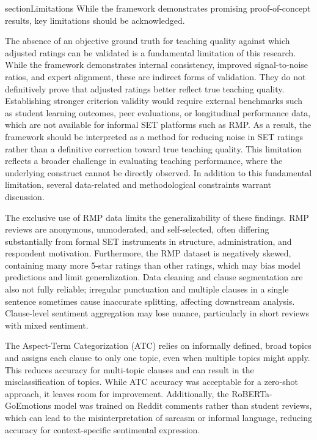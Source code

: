 section{Limitations}
While the framework demonstrates promising proof-of-concept results, key limitations should be acknowledged. 

The absence of an objective ground truth for teaching quality against which adjusted ratings can be validated is a fundamental limitation of this research. While the framework demonstrates internal consistency, improved signal-to-noise ratios, and expert alignment, these are indirect forms of validation. They do not definitively prove that adjusted ratings better reflect true teaching quality. Establishing stronger criterion validity would require external benchmarks such as student learning outcomes, peer evaluations, or longitudinal performance data, which are not available for informal SET platforms such as RMP. As a result, the framework should be interpreted as a method for reducing noise in SET ratings rather than a definitive correction toward true teaching quality. This limitation reflects a broader challenge in evaluating teaching performance, where the underlying construct cannot be directly observed. In addition to this fundamental limitation, several data-related and methodological constraints warrant discussion.

The exclusive use of RMP data limits the generalizability of these findings. RMP reviews are anonymous, unmoderated, and self-selected, often differing substantially from formal SET instruments in structure, administration, and respondent motivation. Furthermore, the RMP dataset is negatively skewed, containing many more 5-star ratings than other ratings, which may bias model predictions and limit generalization. Data cleaning and clause segmentation are also not fully reliable; irregular punctuation and multiple clauses in a single sentence sometimes cause inaccurate splitting, affecting downstream analysis. Clause-level sentiment aggregation may lose nuance, particularly in short reviews with mixed sentiment.

The Aspect-Term Categorization (ATC) relies on informally defined, broad topics and assigns each clause to only one topic, even when multiple topics might apply. This reduces accuracy for multi-topic clauses and can result in the misclassification of topics. While ATC accuracy was acceptable for a zero-shot approach, it leaves room for improvement. Additionally, the RoBERTa-GoEmotions model was trained on Reddit comments rather than student reviews, which can lead to the misinterpretation of sarcasm or informal language, reducing accuracy for context-specific sentimental expression. 

